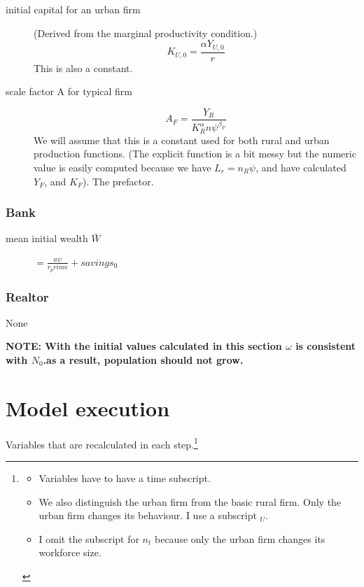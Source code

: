 \begin{description}
\item[initial capital for an urban firm] (Derived from the marginal productivity condition.)
\[K_{U,0}=  \frac{\alpha Y_{U,0} }{r}\]
This is also a constant.

\item[scale factor A for typical  firm] 
\[A_F= \frac{Y_R}{K_R^{\alpha} {n\psi}^{\beta_F}}\]
We will assume that this is a constant used for both rural and urban production functions. (The explicit function is a bit  messy but the numeric value is easily computed because we have $L_r=n_R\psi$, and have calculated $Y_F$, and  $K_F$). The prefactor.

\end{description}

\subsubsection{Bank}
\begin{description}
\item[mean initial wealth $\bar W$] $= \frac {a\psi}{r_prime}+savings_0$
\end{description}

\subsubsection{Realtor}
\begin{description}
\item[None] 
\end{description}


\textbf{NOTE: With the initial values calculated in this section $\omega$ is consistent with $N_0$.as a result, population should not grow. }





\section{Model execution}
Variables that are recalculated in each step.\footnote{\begin{itemize}
    \item Variables have to have a time subscript. 
    \item We also distinguish the urban firm from the basic rural firm.  Only the urban firm changes its behaviour.  I use a subscript $_U$. 
    \item I omit the subscript for $n_t$ because only the urban firm changes its workforce size.
\end{itemize} }


